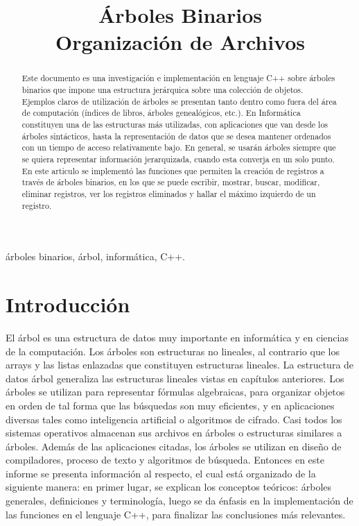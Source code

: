 \documentclass[10pt,conference]{IEEEtran}
\title{Árboles Binarios \\ {\Large Organización de Archivos}}
\author{
\IEEEauthorblockN{1\textsuperscript{do} Angely Mendez}
\IEEEauthorblockA{\textit{Escuela de Informática} \\
\textit{Universidad Nacional de Trujillo}\\
Trujillo, Perú \\
t052701020@unitru.edu.pe}
\and
\IEEEauthorblockN{2\textsuperscript{ero} Ciara Mendez}
\IEEEauthorblockA{\textit{Escuela de Informática} \\
\textit{Universidad Nacional de Trujillo}\\
Trujillo, Perú \\
t022700920@unitru.edu.pe}
}
\begin{document}
\renewcommand{\IEEEkeywordsname}{{\bfseries Palabras claves:}} %

\maketitle
\begin{abstract}
Este documento es una investigación e implementación en lenguaje C++ sobre árboles binarios que impone una estructura jerárquica sobre una colección de objetos. Ejemplos claros de utilización de árboles se presentan tanto dentro como fuera del área de computación (índices de libros, árboles genealógicos, etc.). En Informática constituyen una de las estructuras más utilizadas, con aplicaciones que van desde los árboles sintácticos, hasta la representación de datos que se desea mantener ordenados con un tiempo de acceso relativamente bajo. En general, se usarán árboles siempre que se quiera representar información jerarquizada, cuando esta converja en un solo punto. En este articulo se implementó las funciones que permiten la creación de registros a través de árboles binarios, en los que se puede escribir, mostrar, buscar, modificar, eliminar registros, ver los registros eliminados y hallar el máximo izquierdo de un registro. 
\end{abstract}

\begin{IEEEkeywords}
árboles binarios, árbol, informática, C++.
\end{IEEEkeywords}

\section{\textbf{Introducción}}
El árbol es una estructura de datos muy importante en informática y en ciencias de la computación. Los árboles son estructuras no lineales, al contrario que los arrays y las listas enlazadas que constituyen estructuras lineales. La estructura de datos árbol generaliza las estructuras lineales vistas en capítulos anteriores. Los árboles se utilizan para representar fórmulas algebraicas, para organizar objetos en orden de tal forma que las búsquedas son muy eficientes, y en aplicaciones diversas tales como inteligencia artificial o algoritmos de cifrado. Casi todos los sistemas operativos almacenan sus archivos en árboles o estructuras similares a árboles. Además de las aplicaciones citadas, los árboles se utilizan en diseño de compiladores, proceso de texto y algoritmos de búsqueda.
Entonces en este informe se presenta información al respecto, el cual está organizado de la siguiente manera: en primer lugar, se explican los conceptos teóricos: árboles generales, definiciones y terminología, luego se da énfasis en la implementación de las funciones en el lenguaje C++, para finalizar las conclusiones más relevantes.
\end{document}
